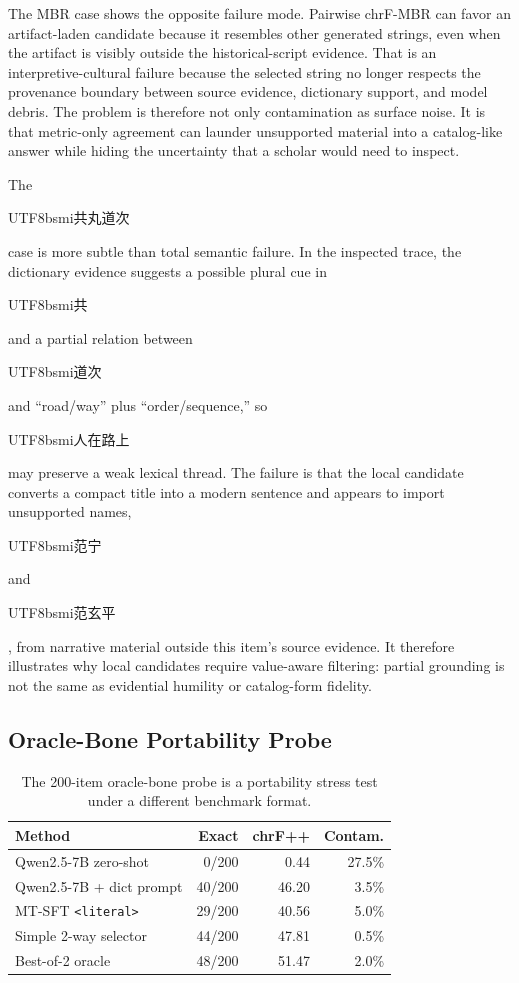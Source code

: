 \documentclass{article}
\newcommand{\zh}[1]{{\begin{CJK*}{UTF8}{bsmi}#1\end{CJK*}}}
\begin{document}
The MBR case shows the opposite failure mode. Pairwise chrF-MBR can favor an artifact-laden candidate because it resembles other generated strings, even when the artifact is visibly outside the historical-script evidence. That is an interpretive-cultural failure because the selected string no longer respects the provenance boundary between source evidence, dictionary support, and model debris. The problem is therefore not only contamination as surface noise. It is that metric-only agreement can launder unsupported material into a catalog-like answer while hiding the uncertainty that a scholar would need to inspect.

The \zh{共丸道次} case is more subtle than total semantic failure. In the inspected trace, the dictionary evidence suggests a possible plural cue in \zh{共} and a partial relation between \zh{道次} and ``road/way'' plus ``order/sequence,'' so \zh{人在路上} may preserve a weak lexical thread. The failure is that the local candidate converts a compact title into a modern sentence and appears to import unsupported names, \zh{范宁} and \zh{范玄平}, from narrative material outside this item's source evidence. It therefore illustrates why local candidates require value-aware filtering: partial grounding is not the same as evidential humility or catalog-form fidelity.

\subsection{Oracle-Bone Portability Probe}

\begin{table}[H]
\centering
\scriptsize
\begin{tabularx}{\columnwidth}{@{}Xrrr@{}}
\toprule
Method & Exact & chrF++ & Contam. \\
\midrule
Qwen2.5-7B zero-shot & 0/200 & 0.44 & 27.5\% \\
Qwen2.5-7B + dict prompt & 40/200 & 46.20 & 3.5\% \\
MT-SFT \texttt{<literal>} & 29/200 & 40.56 & 5.0\% \\
Simple 2-way selector & 44/200 & 47.81 & 0.5\% \\
Best-of-2 oracle & 48/200 & 51.47 & 2.0\% \\
\bottomrule
\end{tabularx}
\caption{The 200-item oracle-bone probe is a portability stress test under a different benchmark format.}
\label{tab:oracle}
\end{table}
\end{document}
